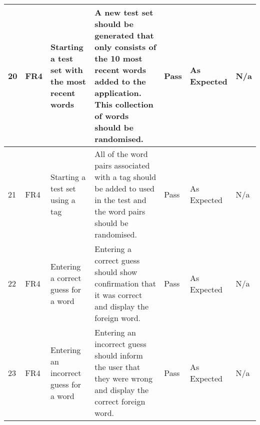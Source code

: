 \documentclass[paper=a4, fontsize=11pt]{scrartcl}	%
\numberwithin{equation}{section}															%
\numberwithin{figure}{section}																%
\numberwithin{table}{section}
\begin{document}
\begin{landscape}
\begin{longtable}{|l|p{2cm}|p{5cm}|p{5cm}|l|p{5cm}|p{5cm}|}
20 & FR4                    & Starting a test set with the most recent words       & A new test set should be generated that only consists of the 10 most recent words added to the application. This collection of words should be randomised.                                                                                 & Pass      & As Expected                                        & N/a                                                                                                                                                                                                                        \\ \hline
21 & FR4                    & Starting a test set using a tag                      & All of the word pairs associated with a tag should be added to used in the test and the word pairs should be randomised.                                                                                                                   & Pass      & As Expected                                        & N/a                                                                                                                                                                                                                        \\ \hline
22 & FR4                    & Entering a correct guess for a word                  & Entering a correct guess should show confirmation that it was correct and display the foreign word.                                                                                                                                        & Pass      & As Expected                                        & N/a                                                                                                                                                                                                                        \\ \hline
23 & FR4                    & Entering an incorrect guess for a word               & Entering an incorrect guess should inform the user that they were wrong and display the correct foreign word.                                                                                                                              & Pass      & As Expected                                        & N/a                                                                                                                                                                                                                        \\ \hline

\end{longtable}
\end{landscape}
\end{document}
